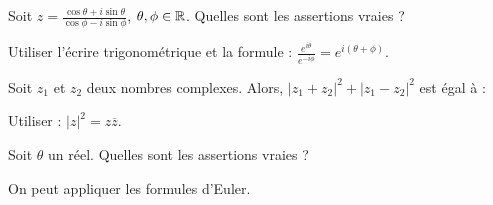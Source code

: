 \begin{question}

Soit $z=\frac{\cos \theta + i \sin \theta}{\cos \phi - i \sin \phi}$, $\theta, \phi \in \mathbb{R}$. 
Quelles sont les assertions vraies ?
\begin{answers}

    


 
\end{answers}
\begin{explanations}
Utiliser l'écrire trigonométrique et  la formule : $\frac{e^{i\theta}}{e^{-i\phi}}= e^{i(\theta + \phi)} $.
\end{explanations}

\end{question}


\begin{question}
 
Soit $z_1$ et $z_2$ deux nombres complexes. Alors, $|z_1+z_2|^2 + |z_1-z_2|^2$ est égal à : 
\begin{answers}
    


    

    

 
\end{answers}
\begin{explanations}
Utiliser :  $|z|^2= z\overline{z}$.
\end{explanations}

\end{question}

\begin{question}
 
Soit $\theta$ un réel.  Quelles sont les assertions vraies ?
\begin{answers}

     
    
  

  
\end{answers}
\begin{explanations}
On peut appliquer les formules d'Euler.

\end{explanations}

\end{question}

